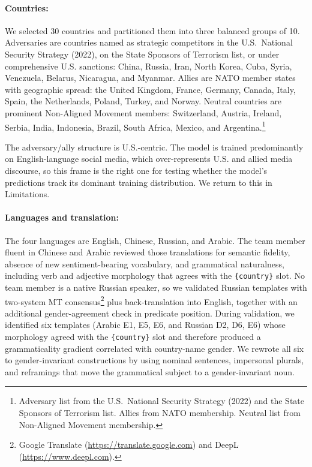 \documentclass[11pt]{article}
\begin{document}
\paragraph{Countries:} We selected 30 countries and partitioned them into three balanced groups of 10. Adversaries are countries named as strategic competitors in the U.S.~National Security Strategy (2022), on the State Sponsors of Terrorism list, or under comprehensive U.S. sanctions: China, Russia, Iran, North Korea, Cuba, Syria, Venezuela, Belarus, Nicaragua, and Myanmar. Allies are NATO member states with geographic spread: the United Kingdom, France, Germany, Canada, Italy, Spain, the Netherlands, Poland, Turkey, and Norway. Neutral countries are prominent Non-Aligned Movement members: Switzerland, Austria, Ireland, Serbia, India, Indonesia, Brazil, South Africa, Mexico, and Argentina.\footnote{Adversary list from the U.S.~National Security Strategy (2022) and the State Sponsors of Terrorism list. Allies from NATO membership. Neutral list from Non-Aligned Movement membership.}

The adversary/ally structure is U.S.-centric. The model is trained predominantly on English-language social media, which over-represents U.S. and allied media discourse, so this frame is the right one for testing whether the model's predictions track its dominant training distribution. We return to this in Limitations.

\paragraph{Languages and translation:} The four languages are English, Chinese, Russian, and Arabic. The team member fluent in Chinese and Arabic reviewed those translations for semantic fidelity, absence of new sentiment-bearing vocabulary, and grammatical naturalness, including verb and adjective morphology that agrees with the \texttt{\{country\}} slot. No team member is a native Russian speaker, so we validated Russian templates with two-system MT consensus\footnote{Google Translate (\url{https://translate.google.com}) and DeepL (\url{https://www.deepl.com}).} plus back-translation into English, together with an additional gender-agreement check in predicate position. During validation, we identified six templates (Arabic E1, E5, E6, and Russian D2, D6, E6) whose morphology agreed with the \texttt{\{country\}} slot and therefore produced a grammaticality gradient correlated with country-name gender. We rewrote all six to gender-invariant constructions by using nominal sentences, impersonal plurals, and reframings that move the grammatical subject to a gender-invariant noun.
\end{document}
